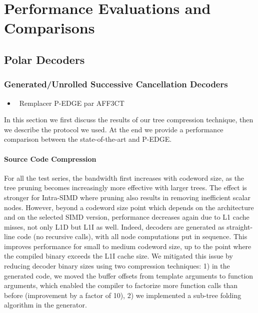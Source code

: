 
\graphicspath{{main/chapter5/fig/}}

\chapter{Performance Evaluations and Comparisons}

\minitoccustom

\section{Polar Decoders}

\subsection{Generated/Unrolled Successive Cancellation Decoders}

\begin{itemize}
  \item \xmark~Remplacer P-EDGE par AFF3CT
\end{itemize}

In this section we first discuss the results of our tree compression technique,
then we describe the protocol we used. At the end we provide a performance
comparison between the state-of-the-art and P-EDGE.

\subsubsection{Source Code Compression}

For all the test series, the bandwidth first increases with codeword size, as
the tree pruning becomes increasingly more effective with larger trees. The
effect is stronger for Intra-SIMD where pruning also results in removing
inefficient scalar nodes. However, beyond a codeword size point which depends on
the architecture and on the selected SIMD version, performance decreases again
due to L1 cache misses, not only L1D but L1I as well. Indeed, decoders are
generated as straight-line code (no recursive calls), with all node computations
put in sequence. This improves performance for small to medium codeword size, up
to the point where the compiled binary exceeds the L1I cache size.
We mitigated this issue by reducing decoder binary sizes using two compression
techniques: 1) in the generated code, we moved the buffer offsets from template
arguments to function arguments, which enabled the compiler to factorize more
function calls than before (improvement by a factor of 10), 2) we implemented a
sub-tree folding algorithm in the generator.


